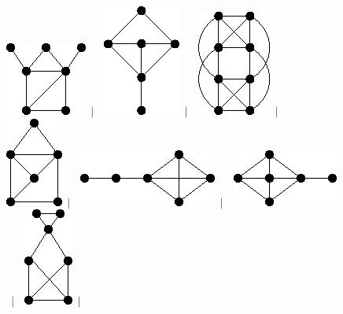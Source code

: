 \documentclass[11pt,paper=b5,footinclude,headinclude]{scrbook} %
\newtheorem{ex}{Vaja\hypertarget{sol:\theex}}[chapter]
\begin{document}
\begin{ex}
\begin{figure}
\includegraphics[scale=0.5]{smallGraphs/g_co-X159.png}$\,\mid\,$\
\includegraphics[scale=0.5]{smallGraphs/g_co-X163.png}$\,\mid\,$\
\includegraphics[scale=0.5]{smallGraphs/g_co-X164.png}$\,\mid\,$\
\includegraphics[scale=0.5]{smallGraphs/g_co-X166.png}$\,\mid\,$\
\includegraphics[scale=0.5]{smallGraphs/g_co-X167.png}$\,\mid\,$\
\includegraphics[scale=0.5]{smallGraphs/g_co-X169.png}$\,\mid\,$\
\includegraphics[scale=0.5]{smallGraphs/g_co-X17.png}$\,\mid\,$\

\end{figure}
\end{ex}
\end{document}
